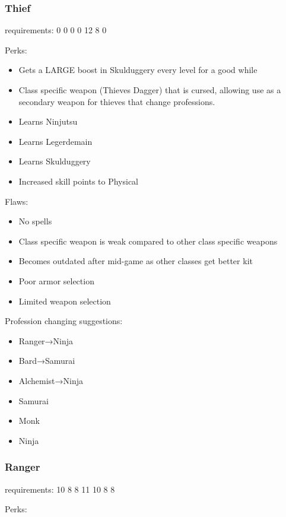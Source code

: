 \documentclass[12pt]{article}
\begin{document}
\subsubsection{Thief}\label{thief}

requirements: 0 0 0 0 12 8 0

Perks:

\begin{itemize}
\item
  Gets a LARGE boost in Skulduggery every level for a good while
\item
  Class specific weapon (Thieves Dagger) that is cursed, allowing use as
  a secondary weapon for thieves that change professions.
\item
  Learns Ninjutsu
\item
  Learns Legerdemain
\item
  Learns Skulduggery
\item
  Increased skill points to Physical
\end{itemize}

Flaws:

\begin{itemize}
\item
  No spells
\item
  Class specific weapon is weak compared to other class specific weapons
\item
  Becomes outdated after mid-game as other classes get better kit
\item
  Poor armor selection
\item
  Limited weapon selection
\end{itemize}

Profession changing suggestions:

\begin{itemize}
\item
  Ranger→Ninja
\item
  Bard→Samurai
\item
  Alchemist→Ninja
\item
  Samurai
\item
  Monk
\item
  Ninja
\end{itemize}

\subsubsection{Ranger}\label{ranger}

requirements: 10 8 8 11 10 8 8

Perks:
\end{document}
